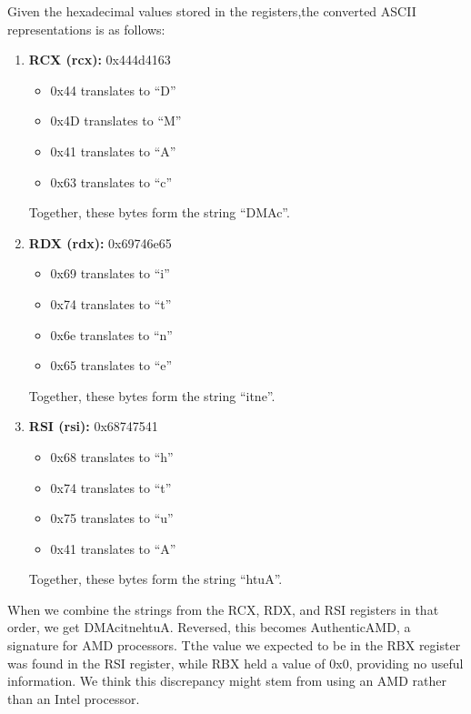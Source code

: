 \documentclass[11pt]{article}
\begin{document}
\begin{solution}
Given the hexadecimal values stored in the registers,the converted ASCII representations is as follows:

\begin{enumerate}
    \item \textbf{RCX (rcx):} 0x444d4163
    \begin{itemize}
        \item 0x44 translates to ``D''
        \item 0x4D translates to ``M''
        \item 0x41 translates to ``A''
        \item 0x63 translates to ``c''
    \end{itemize}
    Together, these bytes form the string ``DMAc''.

    \item \textbf{RDX (rdx):} 0x69746e65
    \begin{itemize}
        \item 0x69 translates to ``i''
        \item 0x74 translates to ``t''
        \item 0x6e translates to ``n''
        \item 0x65 translates to ``e''
    \end{itemize}
    Together, these bytes form the string ``itne''.

    \item \textbf{RSI (rsi):} 0x68747541
    \begin{itemize}
        \item 0x68 translates to ``h''
        \item 0x74 translates to ``t''
        \item 0x75 translates to ``u''
        \item 0x41 translates to ``A''
    \end{itemize}
    Together, these bytes form the string ``htuA''.
\end{enumerate}

When we combine the strings from the RCX, RDX, and RSI registers in that order, we get DMAcitnehtuA. Reversed, this becomes AuthenticAMD, a signature for AMD processors. Tthe value we expected to be in the RBX register was found in the RSI register, while RBX held a value of 0x0, providing no useful information. We think this discrepancy might stem from using an AMD rather than an Intel processor.

\end{solution}
\end{document}
